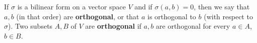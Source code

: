 If $\sigma$ is a bilinear form on a vector space $V$ and if $\sigma(a, b) = 0$, then we say that $a, b$ (in that order) are \textbf{orthogonal}, or that $a$ is orthogonal to $b$ (with respect to $\sigma$). Two subsets $A, B$ of $V$ are \textbf{orthogonal} if $a, b$ are orthogonal for every $a \in A$, $b \in B$.
